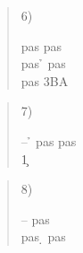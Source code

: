 \documentclass{article}
\begin{document}
\begin{quote}
6)
\hspace{.5\br}
\begin{minipage}[t]{\br}
\begin{bidding}
pas \s\> pas \c \\
pas \h\> pas \c \\
pas \> 3BA\\
\end{bidding}
\end{minipage}
\end{quote}

\begin{quote}
7)
\hspace{.5\br}
\begin{minipage}[t]{\br}
\begin{bidding}
-- \h\> pas \> pas \\
1\s {}\c{}\s {}\h \\
\end{bidding}
\end{minipage}
\end{quote}
\begin{quote}
8)
\hspace{.5\br}
\begin{minipage}[t]{\br}
\begin{bidding}
-- \s\> pas \d \\
pas \d\> pas \s \\
\end{bidding}
\end{minipage}
\end{quote}
\end{document}
